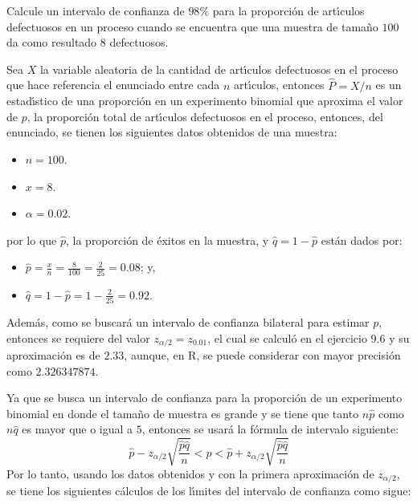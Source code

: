 \begin{enunciado}
 Calcule un intervalo de confianza de $98\%$ para la proporci\'on de art\'{\i}culos defectuosos en un proceso cuando se encuentra que una muestra de tama\~no $100$ da como resultado $8$ defectuosos.
\end{enunciado}

\begin{solucion}
 Sea $X$ la variable aleatoria de la cantidad de art\'{\i}culos defectuosos en el proceso que hace referencia el enunciado entre cada $n$ art\'{\i}culos, entonces $\widehat{P} = X/n$ es un estad\'{\i}stico de una proporci\'on en un experimento binomial que aproxima el valor de $p$, la proporci\'on total de art\'{\i}culos defectuosos en el proceso, entonces, del enunciado, se tienen los siguientes datos obtenidos de una muestra:
 \begin{itemize}
  \item $n=100$.
  \item $x=8$.
  \item $\alpha=0.02$.
 \end{itemize}
 por lo que $\hat{p}$, la proporci\'on de \'exitos en la muestra, y $\hat{q} = 1 - \hat{p}$ est\'an dados por:
 \begin{itemize}
  \item $\hat{p} = \frac{x}{n} = \frac{8}{100} = \frac{2}{25} = 0.08$; y,
  \item $\hat{q} = 1-\hat{p} = 1- \frac{2}{25} = 0.92$.
 \end{itemize}
 Adem\'as, como se buscar\'a un intervalo de confianza bilateral para estimar $p$, entonces se requiere del valor $z_{\alpha/2} = z_{0.01}$, el cual se calcul\'o en el ejercicio 9.6 y su aproximaci\'on es de $2.33$, aunque, en R, se puede considerar con mayor precisi\'on como $2.326347874$.
 \par 
 Ya que se busca un intervalo de confianza para la proporci\'on de un experimento binomial en donde el tama\~no de muestra es grande y se tiene que tanto $n\hat{p}$ como $n\hat{q}$ es mayor que o igual a $5$, entonces se usar\'a la f\'ormula de intervalo siguiente:
 \begin{equation*}
  \hat{p} - z_{\alpha/2}\sqrt{\frac{\hat{p}\hat{q}}{n}} < p < \hat{p} + z_{\alpha/2}\sqrt{\frac{\hat{p}\hat{q}}{n}}
 \end{equation*}
 Por lo tanto, usando los datos obtenidos y con la primera aproximaci\'on de $z_{\alpha/2}$, se tiene los siguientes c\'alculos de los l\'{\i}mites del intervalo de confianza como sigue:
 \begin{eqnarray*}

\end{eqnarray*}
\end{solucion}
